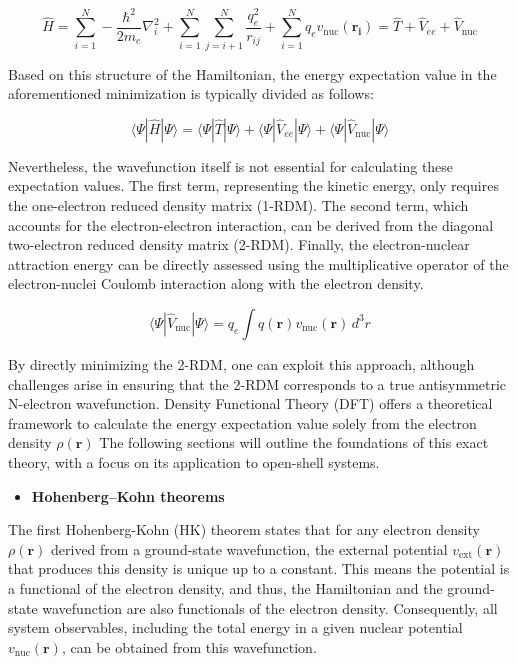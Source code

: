 \documentclass[%
 preprint, linenumbers,
 amsmath,amssymb,
 aps, physrev,
]{revtex4-2}
\begin{document}
\begin{equation}
    \hat{H} = \sum_{i=1}^{N} - \frac{\hbar^2}{2m_e} \nabla_i^2 + \sum_{i=1}^{N} \sum_{j=i+1}^{N} \frac{q_e^2}{r_{ij}} + \sum_{i=1}^{N} q_e v_{\text{nuc}}(\mathbf{r_i}) = \hat{T} + \hat{V}_{ee} + \hat{V}_{\text{nuc}}
\end{equation}

Based on this structure of the Hamiltonian, the energy expectation value in the aforementioned minimization is typically divided as follows:

\begin{equation}
    \langle \Psi | \hat{H} | \Psi \rangle = \langle \Psi | \hat{T} | \Psi \rangle + \langle \Psi | \hat{V}_{ee} | \Psi \rangle + \langle \Psi | \hat{V}_{\text{nuc}} | \Psi \rangle
\end{equation}

Nevertheless, the wavefunction itself is not essential for calculating these expectation values. The first term, representing the kinetic energy, only requires the one-electron reduced density matrix (1-RDM). The second term, which accounts for the electron-electron interaction, can be derived from the diagonal two-electron reduced density matrix (2-RDM). Finally, the electron-nuclear attraction energy can be directly assessed using the multiplicative operator of the electron-nuclei Coulomb interaction along with the electron density.


\begin{equation}
    \langle \Psi | \hat{V}_{\text{nuc}} | \Psi \rangle = q_e \int q(\mathbf{r}) v_{\text{nuc}}(\mathbf{r}) \, d^3r
\end{equation}

By directly minimizing the 2-RDM, one can exploit this approach, although challenges arise in ensuring that the 2-RDM corresponds to a true antisymmetric N-electron wavefunction. Density Functional Theory (DFT) offers a theoretical framework to calculate the energy expectation value solely from the electron density \(\rho (\mathbf{r})\) The following sections will outline the foundations of this exact theory, with a focus on its application to open-shell systems.

\begin{itemize}
    \item  \textbf{Hohenberg–Kohn theorems}
\end{itemize}

The first Hohenberg-Kohn (HK) theorem states that for any electron density \( \rho(\mathbf{r}) \) derived from a ground-state wavefunction, the external potential \( v_{\text{ext}}(\mathbf{r}) \) that produces this density is unique up to a constant. This means the potential is a functional of the electron density, and thus, the Hamiltonian and the ground-state wavefunction are also functionals of the electron density. Consequently, all system observables, including the total energy in a given nuclear potential \( v_{\text{nuc}}(\mathbf{r}) \), can be obtained from this wavefunction.
\end{document}
